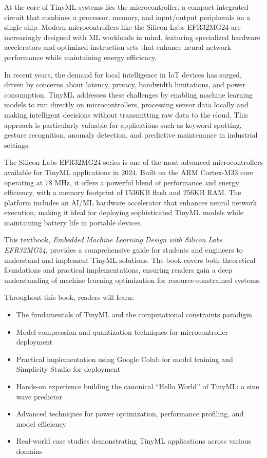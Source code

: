 \documentclass[
  9pt,
  letterpaper,
  abstract,
  titlepage]{scrbook}
\providecommand{\tightlist}{%
  \setlength{\itemsep}{0pt}\setlength{\parskip}{0pt}}\usepackage{longtable,booktabs,array}
\def\tightlist{}
\let\tightlist\relax
\begin{document}
At the core of TinyML systems lies the microcontroller, a compact
integrated circuit that combines a processor, memory, and input/output
peripherals on a single chip. Modern microcontrollers like the Silicon
Labs EFR32MG24 are increasingly designed with ML workloads in mind,
featuring specialized hardware accelerators and optimized instruction
sets that enhance neural network performance while maintaining energy
efficiency.

In recent years, the demand for local intelligence in IoT devices has
surged, driven by concerns about latency, privacy, bandwidth
limitations, and power consumption. TinyML addresses these challenges by
enabling machine learning models to run directly on microcontrollers,
processing sensor data locally and making intelligent decisions without
transmitting raw data to the cloud. This approach is particularly
valuable for applications such as keyword spotting, gesture recognition,
anomaly detection, and predictive maintenance in industrial settings.

The Silicon Labs EFR32MG24 series is one of the most advanced
microcontrollers available for TinyML applications in 2024. Built on the
ARM Cortex-M33 core operating at 78 MHz, it offers a powerful blend of
performance and energy efficiency, with a memory footprint of 1536KB
flash and 256KB RAM. The platform includes an AI/ML hardware accelerator
that enhances neural network execution, making it ideal for deploying
sophisticated TinyML models while maintaining battery life in portable
devices.

This textbook, \emph{Embedded Machine Learning Design with Silicon Labs
EFR32MG24}, provides a comprehensive guide for students and engineers to
understand and implement TinyML solutions. The book covers both
theoretical foundations and practical implementations, ensuring readers
gain a deep understanding of machine learning optimization for
resource-constrained systems.

Throughout this book, readers will learn:

\begin{itemize}
\tightlist
\item
  The fundamentals of TinyML and the computational constraints paradigm
\item
  Model compression and quantization techniques for microcontroller
  deployment
\item
  Practical implementation using Google Colab for model training and
  Simplicity Studio for deployment
\item
  Hands-on experience building the canonical ``Hello World'' of TinyML:
  a sine wave predictor
\item
  Advanced techniques for power optimization, performance profiling, and
  model efficiency
\item
  Real-world case studies demonstrating TinyML applications across
  various domains
\end{itemize}
\end{document}
